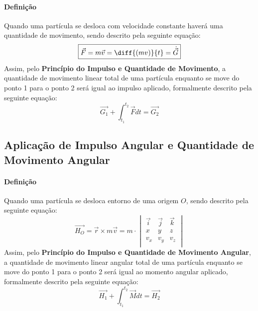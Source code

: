 \documentclass{article}
\begin{document}
            \paragraph{Definição}Quando uma partícula se desloca com velocidade constante haverá uma quantidade de movimento, sendo descrito pela seguinte equação:
                \begin{equation}
                    \boxed{
                        \vec{F} = m \vec{v} = \diff{(mv)}{t} = \dot{\vec{G}}
                    }
                \end{equation}
            Assim, pelo \textbf{Princípio do Impulso e Quantidade de Movimento}, a quantidade de movimento linear total de uma partícula enquanto se move do ponto 1 para o ponto 2 será igual ao impulso aplicado, formalmente descrito pela seguinte equação:
                \begin{equation}
                    \boxed{
                        \vec{G_{1}} + \int_{t_{1}}^{t_{2}} \vec{F} dt = \vec{G_{2}}
                    }
                \end{equation}

        \subsection{Aplicação de Impulso Angular e Quantidade de Movimento Angular}
            \paragraph{Definição}Quando uma partícula se desloca entorno de uma origem $O$, sendo descrito pela seguinte equação:
                \begin{equation}
                    \boxed{
                        \vec{H_{O}} = \vec{r} \times m\vec{v} = m \cdot
                        \begin{vmatrix}
                            \vec{i} & \vec{j} & \vec{k}\\
                            x       & y       & z\\
                            v_{x}   & v_{y}   & v_{z}\\
                        \end{vmatrix}
                    }
                \end{equation}
            Assim, pelo \textbf{Princípio do Impulso e Quantidade de Movimento Angular}, a quantidade de movimento linear angular total de uma partícula enquanto se move do ponto 1 para o ponto 2 será igual ao momento angular aplicado, formalmente descrito pela seguinte equação:
                \begin{equation}
                    \boxed{
                        \vec{H_{1}} + \int_{t_{1}}^{t_{2}} \vec{M} dt = \vec{H_{2}}
                    }
                \end{equation}
\end{document}
